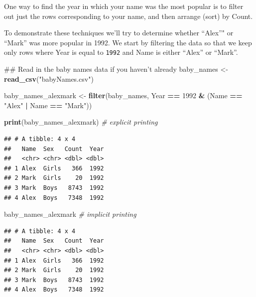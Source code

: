 \documentclass[]{book}
\newenvironment{Shaded}{\begin{snugshade}}{\end{snugshade}}
\newcommand{\KeywordTok}[1]{\textcolor[rgb]{0.13,0.29,0.53}{\textbf{#1}}}
\newcommand{\DecValTok}[1]{\textcolor[rgb]{0.00,0.00,0.81}{#1}}
\newcommand{\StringTok}[1]{\textcolor[rgb]{0.31,0.60,0.02}{#1}}
\newcommand{\CommentTok}[1]{\textcolor[rgb]{0.56,0.35,0.01}{\textit{#1}}}
\newcommand{\OperatorTok}[1]{\textcolor[rgb]{0.81,0.36,0.00}{\textbf{#1}}}
\newcommand{\NormalTok}[1]{#1}
\begin{document}
One way to find the year in which your name was the most popular is to
filter out just the rows corresponding to your name, and then arrange
(sort) by Count.

To demonstrate these techniques we'll try to determine whether ``Alex''"
or ``Mark'' was more popular in 1992. We start by filtering the data so
that we keep only rows where Year is equal to \texttt{1992} and Name is
either ``Alex'' or ``Mark''.

\begin{Shaded}
\begin{Highlighting}[]
\NormalTok{## Read in the baby names data if you haven't already}
\NormalTok{baby_names <-}\StringTok{ }\KeywordTok{read_csv}\NormalTok{(}\StringTok{"babyNames.csv"}\NormalTok{)}
\end{Highlighting}
\end{Shaded}

\begin{Shaded}
\begin{Highlighting}[]
\NormalTok{baby_names_alexmark <-}\StringTok{ }\KeywordTok{filter}\NormalTok{(baby_names, }
\NormalTok{             Year }\OperatorTok{==}\StringTok{ }\DecValTok{1992} \OperatorTok{&}\StringTok{ }\NormalTok{(Name }\OperatorTok{==}\StringTok{ "Alex"} \OperatorTok{|}\StringTok{ }\NormalTok{Name }\OperatorTok{==}\StringTok{ "Mark"}\NormalTok{))}

\KeywordTok{print}\NormalTok{(baby_names_alexmark) }\CommentTok{# explicit printing             }
\end{Highlighting}
\end{Shaded}

\begin{verbatim}
## # A tibble: 4 x 4
##   Name  Sex   Count  Year
##   <chr> <chr> <dbl> <dbl>
## 1 Alex  Girls   366  1992
## 2 Mark  Girls    20  1992
## 3 Mark  Boys   8743  1992
## 4 Alex  Boys   7348  1992
\end{verbatim}

\begin{Shaded}
\begin{Highlighting}[]
\NormalTok{baby_names_alexmark }\CommentTok{# implicit printing}
\end{Highlighting}
\end{Shaded}

\begin{verbatim}
## # A tibble: 4 x 4
##   Name  Sex   Count  Year
##   <chr> <chr> <dbl> <dbl>
## 1 Alex  Girls   366  1992
## 2 Mark  Girls    20  1992
## 3 Mark  Boys   8743  1992
## 4 Alex  Boys   7348  1992
\end{verbatim}
\end{document}
